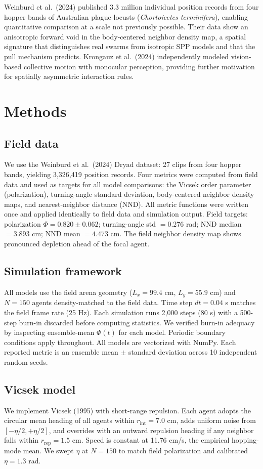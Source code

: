 \documentclass[11pt]{article}
\begin{document}
Weinburd et al.\ (2024) published 3.3 million individual position records from four hopper bands of Australian plague locusts (\emph{Chortoicetes terminifera}), enabling quantitative comparison at a scale not previously possible. Their data show an anisotropic forward void in the body-centered neighbor density map, a spatial signature that distinguishes real swarms from isotropic SPP models and that the pull mechanism predicts. Krongauz et al.\ (2024) independently modeled vision-based collective motion with monocular perception, providing further motivation for spatially asymmetric interaction rules.

\section{Methods}

\subsection{Field data}
We use the Weinburd et al.\ (2024) Dryad dataset: 27 clips from four hopper bands, yielding 3{,}326{,}419 position records. Four metrics were computed from field data and used as targets for all model comparisons: the Vicsek order parameter (polarization), turning-angle standard deviation, body-centered neighbor density maps, and nearest-neighbor distance (NND). All metric functions were written once and applied identically to field data and simulation output. Field targets: polarization $\Phi = 0.820 \pm 0.062$; turning-angle std $= 0.276$ rad; NND median $= 3.893$ cm; NND mean $= 4.473$ cm. The field neighbor density map shows pronounced depletion ahead of the focal agent.

\subsection{Simulation framework}
All models use the field arena geometry ($L_x = 99.4$ cm, $L_y = 55.9$ cm) and $N = 150$ agents density-matched to the field data. Time step $dt = 0.04$ s matches the field frame rate (25 Hz). Each simulation runs 2{,}000 steps (80 s) with a 500-step burn-in discarded before computing statistics. We verified burn-in adequacy by inspecting ensemble-mean $\Phi(t)$ for each model. Periodic boundary conditions apply throughout. All models are vectorized with NumPy. Each reported metric is an ensemble mean $\pm$ standard deviation across 10 independent random seeds.

\subsection{Vicsek model}
We implement Vicsek (1995) with short-range repulsion. Each agent adopts the circular mean heading of all agents within $r_{\mathrm{int}} = 7.0$ cm, adds uniform noise from $[-\eta/2, +\eta/2]$, and overrides with an outward repulsion heading if any neighbor falls within $r_{\mathrm{rep}} = 1.5$ cm. Speed is constant at 11.76 cm/s, the empirical hopping-mode mean. We swept $\eta$ at $N = 150$ to match field polarization and calibrated $\eta = 1.3$ rad.
\end{document}
